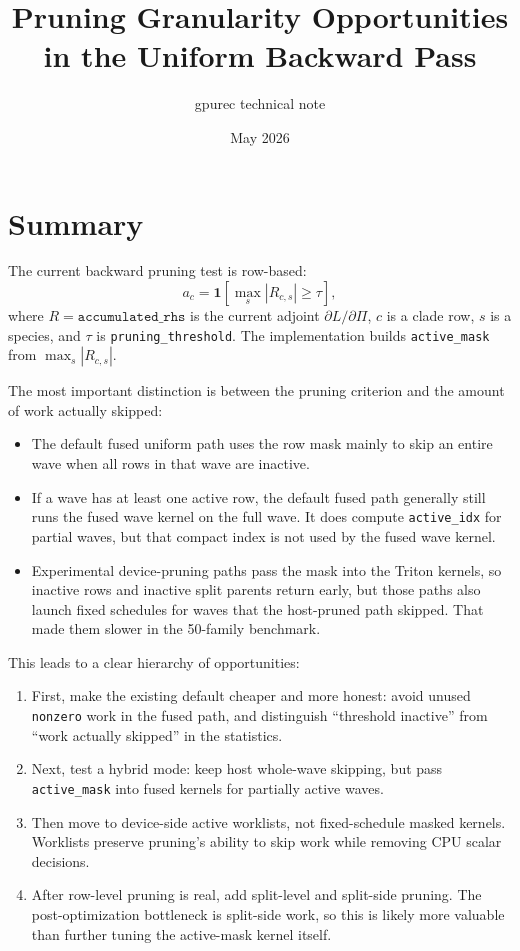 \documentclass[11pt]{article}
\title{Pruning Granularity Opportunities in the Uniform Backward Pass}
\author{gpurec technical note}
\date{May 2026}
\newcommand{\code}[1]{\texttt{#1}}
\begin{document}
\maketitle

\section{Summary}

The current backward pruning test is row-based:
\[
  a_c = \mathbf{1}\left[\max_s |R_{c,s}| \ge \tau \right],
\]
where \(R = \code{accumulated\_rhs}\) is the current adjoint
\(\partial L/\partial \Pi\), \(c\) is a clade row, \(s\) is a species, and
\(\tau\) is \code{pruning\_threshold}.  The implementation builds
\code{active\_mask} from \(\max_s |R_{c,s}|\).

The most important distinction is between the pruning criterion and the amount
of work actually skipped:

\begin{itemize}[leftmargin=*]
\item The default fused uniform path uses the row mask mainly to skip an entire
      wave when all rows in that wave are inactive.
\item If a wave has at least one active row, the default fused path generally
      still runs the fused wave kernel on the full wave.  It does compute
      \code{active\_idx} for partial waves, but that compact index is not used
      by the fused wave kernel.
\item Experimental device-pruning paths pass the mask into the Triton kernels,
      so inactive rows and inactive split parents return early, but those paths
      also launch fixed schedules for waves that the host-pruned path skipped.
      That made them slower in the 50-family benchmark.
\end{itemize}

This leads to a clear hierarchy of opportunities:

\begin{enumerate}[leftmargin=*]
\item First, make the existing default cheaper and more honest: avoid unused
      \code{nonzero} work in the fused path, and distinguish ``threshold
      inactive'' from ``work actually skipped'' in the statistics.
\item Next, test a hybrid mode: keep host whole-wave skipping, but pass
      \code{active\_mask} into fused kernels for partially active waves.
\item Then move to device-side active worklists, not fixed-schedule masked
      kernels.  Worklists preserve pruning's ability to skip work while removing
      CPU scalar decisions.
\item After row-level pruning is real, add split-level and split-side pruning.
      The post-optimization bottleneck is split-side work, so this is likely
      more valuable than further tuning the active-mask kernel itself.
\end{enumerate}
\end{document}
